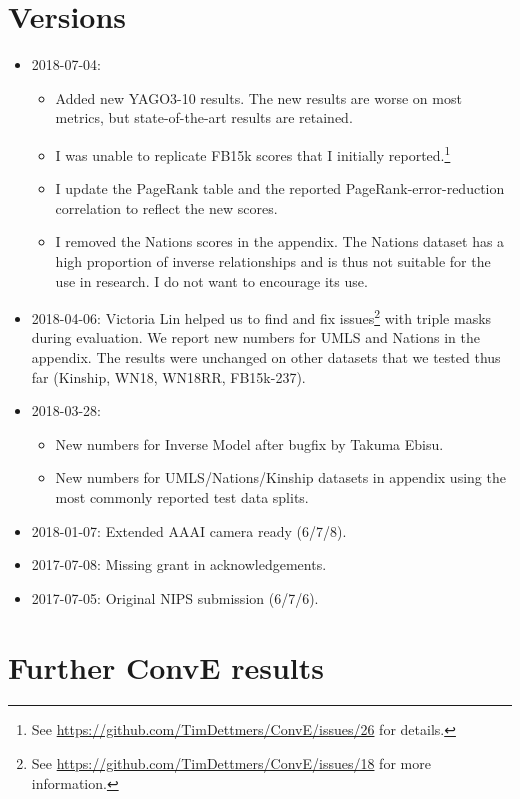 \documentclass[letterpaper]{article}
\begin{document}
\section{Versions}

\begin{itemize}
 \item 2018-07-04: 
     \begin{itemize}
        \item Added new YAGO3-10 results. The new results are worse on most metrics, but state-of-the-art results are retained. 
        \item I was unable to replicate FB15k scores that I initially reported.\footnote{See \url{https://github.com/TimDettmers/ConvE/issues/26} for details.} 
        \item I update the PageRank table and the reported PageRank-error-reduction correlation to reflect the new scores.
        \item I removed the Nations scores in the appendix. The Nations dataset has a high proportion of inverse relationships and is thus not suitable for the use in research. I do not want to encourage its use.
  \end{itemize}
 \item 2018-04-06: Victoria Lin helped us to find and fix issues\footnote{See \url{https://github.com/TimDettmers/ConvE/issues/18} for more information.} with triple masks during evaluation. We report new numbers for UMLS and Nations in the appendix. The results were unchanged on other datasets that we tested thus far (Kinship, WN18, WN18RR, FB15k-237).
    \item 2018-03-28: 
    \begin{itemize}
        \item New numbers for Inverse Model after bugfix by Takuma Ebisu.
        \item New numbers for UMLS/Nations/Kinship datasets in appendix using the most commonly reported test data splits.
    \end{itemize}
    \item 2018-01-07: Extended AAAI camera ready (6/7/8).
    \item 2017-07-08: Missing grant in acknowledgements.
    \item 2017-07-05: Original NIPS submission (6/7/6).
\end{itemize}


\section{Further ConvE results}
\end{document}

